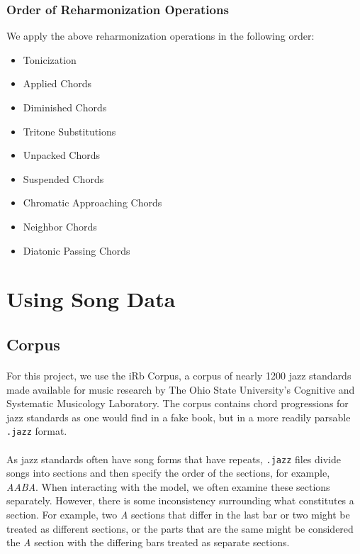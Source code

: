 \documentclass[]{article}
\begin{document}
\subsubsection{Order of Reharmonization Operations}
We apply the above reharmonization operations in the following order:
\begin{itemize}
	\item Tonicization
	\item Applied Chords
	\item Diminished Chords
	\item Tritone Substitutions
	\item Unpacked Chords
	\item Suspended Chords
	\item Chromatic Approaching Chords
	\item Neighbor Chords
	\item Diatonic Passing Chords
\end{itemize}

\section{Using Song Data}
\subsection{Corpus}
\paragraph{} For this project, we use the iRb Corpus, a corpus of nearly 1200 jazz standards made available for music research by The Ohio State University's Cognitive and Systematic Musicology Laboratory.  The corpus contains chord progressions for jazz standards as one would find in a fake book, but in a more readily parsable \texttt{.jazz} format.

\paragraph{} As jazz standards often have song forms that have repeats, \texttt{.jazz} files divide songs into sections and then specify the order of the sections, for example, \textit{AABA}.  When interacting with the model, we often examine these sections separately.  However, there is some inconsistency surrounding what constitutes a section.  For example, two \textit{A} sections that differ in the last bar or two might be treated as different sections, or the parts that are the same might be considered the \textit{A} section with the differing bars treated as separate sections.
\end{document}
